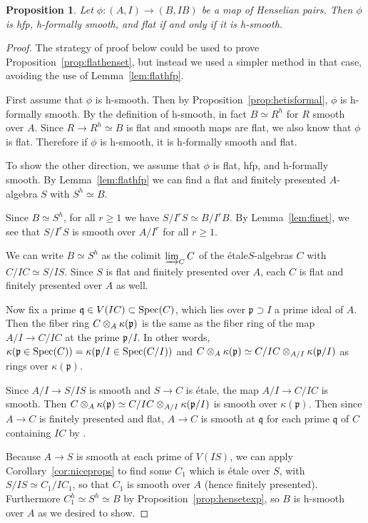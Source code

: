 \documentclass[12pt]{article}
\newcommand{\spec}{{\rm Spec}}
\newcommand{\colim}{\varinjlim}
\newcommand{\mf}[1]{\mathfrak{#1}}
\newcommand{\Et}{\'etale\xspace}
\newcommand{\hfp}{hfp\xspace}
\newcommand{\hsmooth}{h-smooth\xspace}
\newcommand{\hfsmooth}{h-formally smooth\xspace}
\newcommand{\spcite}[2]{\cite[\href{https://stacks.math.columbia.edu/tag/#1}{{#2} {#1}}]{stackp}}
\newtheorem{proposition}[theorem]{Proposition}
\theoremstyle{definition}
\numberwithin{equation}{subsection}
\begin{document}
\begin{proposition}\label{prop:flathenssm} Let $\phi: (A,I) \to (B,IB)$ be a map of Henselian pairs. Then $\phi$ is \hfp, \hfsmooth, and flat if and only if it is \hsmooth.
\end{proposition}
\begin{proof} The strategy of proof below could be used to prove Proposition~\ref{prop:flathenset}, but instead we used a simpler method in that case, avoiding the use of Lemma~\ref{lem:flathfp}.

First assume that $\phi$ is \hsmooth. Then by Proposition~\ref{prop:hetisformal}, $\phi$ is \hfsmooth. By the definition of \hsmooth, in fact $B \simeq R^h$ for $R$ smooth over $A$. Since $R \to R^h \simeq B$ is flat and smooth maps are flat, we also know that $\phi$ is flat. Therefore if $\phi$ is \hsmooth, it is \hfsmooth and flat.

To show the other direction, we assume that $\phi$ is flat, \hfp, and \hfsmooth. By Lemma~\ref{lem:flathfp} we can find a flat and finitely presented $A$-algebra $S$ with $S^h \simeq B$.

Since $B \simeq S^h$, for all $r \ge 1$ we have $S/I^rS \simeq B/I^rB$. By Lemma~\ref{lem:finet}, we see that $S/I^rS$ is smooth over $A/I^r$ for all $r \ge 1$.

We can write $B \simeq S^h$ as the colimit $\colim_C C$ of the \Et $S$-algebras $C$ with $C/IC \simeq S/IS$. Since $S$ is flat and finitely presented over $A$, each $C$ is flat and finitely presented over $A$ as well.

Now fix a prime $\mf{q} \in V(IC) \subset \spec(C)$, which lies over $\mf{p} \supset I$ a prime ideal of $A$. Then the fiber ring $C \tens_A \kappa({\mf{p}})$ is the same as the fiber ring of the map $A/I \to C/IC$ at the prime $\mf{p}/I$. In other words, $\kappa(\mf{p} \in \spec(C)) = \kappa(\mf{p}/I \in \spec(C/I))$ and $C \tens_A \kappa({\mf{p}}) \simeq C/IC \tens_{A/I} \kappa(\mf{p}/I)$ as rings over $\kappa(\mf{p})$. 

Since $A/I \to S/IS$ is smooth and $S \to C$ is \Et, the map $A/I \to C/IC$ is smooth. Then $C \tens_A \kappa({\mf{p}}) \simeq C/IC \tens_{A/I} \kappa(\mf{p}/I)$ is smooth over $\kappa(\mf{p})$. Then since $A \to C$ is finitely presented and flat, $A \to C$ is smooth at $\mf{q}$ for each prime $\mf{q}$ of $C$ containing $IC$ by \spcite{00TF}{Lemma}.

Because $A \to S$ is smooth at each prime of $V(IS)$, we can apply Corollary~\ref{cor:niceprops} to find some $C_1$ which is \Et over $S$, with $S/IS \simeq C_1/IC_1$, so that $C_1$ is smooth over $A$ (hence finitely presented). Furthermore $C_1^h \simeq S^h \simeq B$ by Proposition~\ref{prop:hensetexp}, so $B$ is \hsmooth over $A$ as we desired to show.\end{proof}
\end{document}

